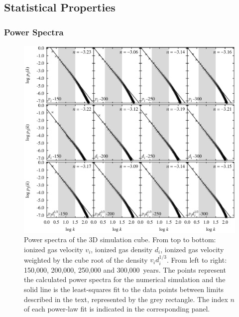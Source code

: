 \documentclass[useAMS,usenatbib]{mn2e}
\providecommand{\DIFadd}[1]{{\protect\color{red!70!black}#1}} %
\providecommand{\DIFaddFL}[1]{\DIFadd{#1}} %
\providecommand{\DIFaddbeginFL}{} %
\providecommand{\DIFaddendFL}{} %
\providecommand{\DIFdelbeginFL}{} %
\providecommand{\DIFdelendFL}{} %
\begin{document}
\subsection{Statistical Properties}
\label{subsec:statprop}
\subsubsection{Power Spectra}
\label{sssec:pspec}
\begin{figure}
\centering
\DIFdelbeginFL %
\DIFdelendFL %
\DIFaddbeginFL \includegraphics[width=\textwidth]{ps-all-3k-ref}
\DIFaddendFL \caption{Power spectra of the 3D simulation cube. From top to bottom: ionized gas velocity
  $v_i$, ionized gas density $d_i$, ionized gas velocity weighted by the cube root
  of the density $v_i d_i^{1/3}$.  From left to right: 150,000, 200,000, 250,000 and
  300,000~years. The points represent the calculated power spectra for
  the numerical simulation  and the solid line is the least-squares fit to
the data points between limits described in the
text, represented by the grey rectangle. \DIFaddbeginFL \DIFaddFL{The index $n$ of each
power-law fit is indicated in the corresponding panel.}\DIFaddendFL }
\label{fig:ps}
\end{figure}
\end{document}
